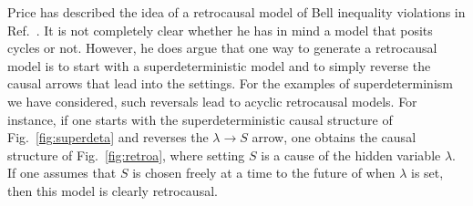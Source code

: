 \documentclass[12pt,onecolumn,nofootinbib]{revtex4-2}
\begin{document}
Price has described the idea of a retrocausal model of Bell inequality violations in Ref.~\cite{price1997time}.  It is not completely clear whether he has in mind a model that posits cycles or not.  However, he does argue that one way to generate a retrocausal model is to start with a superdeterministic model and to simply reverse the causal arrows that lead into the settings.  For the examples of superdeterminism we have considered, such reversals lead to acyclic retrocausal models.
For instance, if one starts with the superdeterministic causal structure of Fig.~\ref{fig:superdeta} and reverses the $\lambda \to S$ arrow, one obtains the causal structure of Fig.~\ref{fig:retroa}, where setting $S$ is a cause of the hidden variable $\lambda$.  If one assumes that $S$ is chosen freely at a time to the future of when $\lambda$ is set, then this model is clearly retrocausal.
\end{document}
